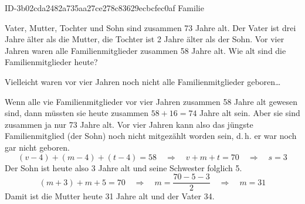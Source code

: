 \begin{exercise}
      {ID-3b02cda2482a735aa27ce278c83629ecbcfec0af}
      {Familie}
  \ifproblem\problem\par
    Vater, Mutter, Tochter und Sohn sind zusammen 73 Jahre alt.
    Der Vater ist drei Jahre älter als die Mutter, die Tochter
    ist 2 Jahre älter als der Sohn. Vor vier Jahren waren
    alle Familienmitglieder zusammen 58 Jahre alt.
    Wie alt sind die Familienmitglieder heute?
  \fi
  \ifoutline\outline\par
    Vielleicht waren vor vier Jahren noch nicht alle Familienmitglieder geboren\ldots
  \fi
  \ifoutcome\outcome\par
    Wenn alle vie Familienmitglieder vor vier Jahren zusammen
    58 Jahre alt gewesen sind, dann müssten sie heute zusammen
    $58+16=74$ Jahre alt sein. Aber sie sind zusammen ja nur
    73 Jahre alt. Vor vier Jahren kann also das jüngste
    Familienmitglied (der Sohn) noch nicht mitgezählt worden
    sein, d.\,h. er war noch gar nicht geboren.
    \begin{equation*}
      (v-4)+(m-4)+(t-4)=58\quad\Rightarrow\quad v+m+t=70\quad\Rightarrow\quad s=3
    \end{equation*}
    Der Sohn ist heute also 3 Jahre alt und seine Schwester folglich 5.
    \begin{equation*}
      (m+3)+m+5=70\quad\Rightarrow\quad m=\frac{70-5-3}{2}\quad\Rightarrow\quad m=31
    \end{equation*}
    Damit ist die Mutter heute 31 Jahre alt und der Vater 34.
  \fi
\end{exercise}
